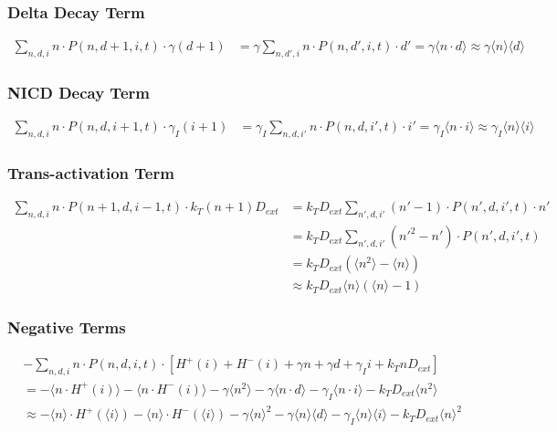 \documentclass{article}
\begin{document}
\begin{flushleft}
\subsubsection*{Delta Decay Term}
\begin{align*}
\sum_{n,d,i} n \cdot P(n,d+1,i,t) \cdot \gamma(d+1) &= \gamma \sum_{n,d',i} n \cdot P(n,d',i,t) \cdot d' = \gamma \langle n \cdot d \rangle \approx \gamma \langle n \rangle \langle d \rangle
\end{align*}

\subsubsection*{NICD Decay Term}
\begin{align*}
\sum_{n,d,i} n \cdot P(n,d,i+1,t) \cdot \gamma_I(i+1) &= \gamma_I \sum_{n,d,i'} n \cdot P(n,d,i',t) \cdot i' = \gamma_I \langle n \cdot i \rangle \approx \gamma_I \langle n \rangle \langle i \rangle
\end{align*}

\subsubsection*{Trans-activation Term}
\begin{align*}
\sum_{n,d,i} n \cdot P(n+1,d,i-1,t) \cdot k_T(n+1)D_{ext} &= k_T D_{ext} \sum_{n',d,i'} (n'-1) \cdot P(n',d,i',t) \cdot n' \\
&= k_T D_{ext} \sum_{n',d,i'} (n'^2 - n') \cdot P(n',d,i',t) \\
&= k_T D_{ext} (\langle n^2 \rangle - \langle n \rangle) \\
&\approx k_T D_{ext} \langle n \rangle (\langle n \rangle - 1)
\end{align*}

\subsubsection*{Negative Terms}
\begin{align*}
&-\sum_{n,d,i} n \cdot P(n,d,i,t) \cdot [H^+(i) + H^-(i) + \gamma n + \gamma d + \gamma_I i + k_T n D_{ext}] \\
&= -\langle n \cdot H^+(i) \rangle - \langle n \cdot H^-(i) \rangle - \gamma \langle n^2 \rangle - \gamma \langle n \cdot d \rangle - \gamma_I \langle n \cdot i \rangle - k_T D_{ext} \langle n^2 \rangle \\
&\approx -\langle n \rangle \cdot H^+(\langle i \rangle) - \langle n \rangle \cdot H^-(\langle i \rangle) - \gamma \langle n \rangle^2 - \gamma \langle n \rangle \langle d \rangle - \gamma_I \langle n \rangle \langle i \rangle - k_T D_{ext} \langle n \rangle^2
\end{align*}


\end{flushleft}
\end{document}
